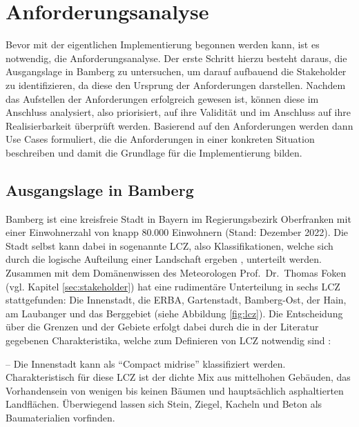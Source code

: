 \chapter{Anforderungsanalyse}
\label{sec:requirements}
Bevor mit der eigentlichen Implementierung begonnen werden kann, ist es notwendig, die Anforderungsanalyse. Der erste Schritt hierzu besteht daraus, die Ausgangslage in Bamberg zu untersuchen, um darauf aufbauend die Stakeholder zu identifizieren, da diese den Ursprung der Anforderungen darstellen. Nachdem das Aufstellen der Anforderungen erfolgreich gewesen ist, können diese im Anschluss analysiert, also priorisiert, auf ihre Validität und im Anschluss auf ihre Realisierbarkeit überprüft werden. Basierend auf den Anforderungen werden dann Use Cases formuliert, die die Anforderungen in einer konkreten Situation beschreiben und damit die Grundlage für die Implementierung bilden.

\section{Ausgangslage in Bamberg}
\label{sec:ausgangslage}
Bamberg ist eine kreisfreie Stadt in Bayern im Regierungsbezirk Oberfranken mit einer Einwohnerzahl von knapp 80.000 Einwohnern (Stand: Dezember 2022). Die Stadt selbst kann dabei in sogenannte \ac{LCZ}, also Klassifikationen, welche sich durch die logische Aufteilung einer Landschaft ergeben \cite{stewart2011local}, unterteilt werden. Zusammen mit dem Domänenwissen des Meteorologen Prof.\ Dr.\ Thomas Foken (vgl. Kapitel \ref{sec:stakeholder}) hat eine rudimentäre Unterteilung in sechs \ac{LCZ} stattgefunden: Die Innenstadt, die ERBA, Gartenstadt, Bamberg-Ost, der Hain, am Laubanger und das Berggebiet (siehe Abbildung \ref{fig:lcz}). Die Entscheidung über die Grenzen und der Gebiete erfolgt dabei durch die in der Literatur gegebenen Charakteristika, welche zum Definieren von \ac{LCZ} notwendig sind \cite{oke2004initial, stewart2012local}:

 -- Die Innenstadt kann als \enquote{Compact midrise} klassifiziert werden. Charakteristisch für diese \ac{LCZ} ist der dichte Mix aus mittelhohen Gebäuden, das Vorhandensein von wenigen bis keinen Bäumen und hauptsächlich asphaltierten Landflächen. Überwiegend lassen sich Stein, Ziegel, Kacheln und Beton als Baumaterialien vorfinden.

